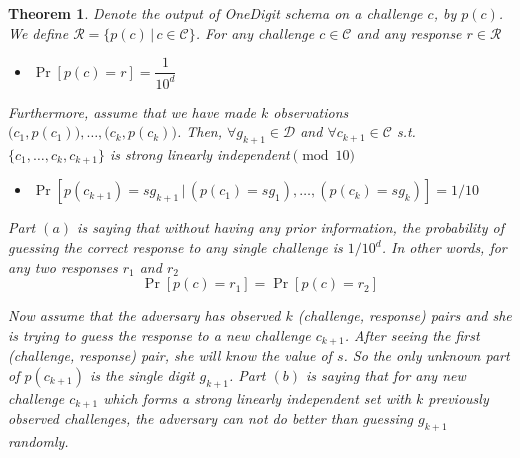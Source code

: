 \documentclass{article}
\newtheorem{theorem}{Theorem}
\begin{document}
\begin{theorem}
\label{thm:main}
	Denote the output of OneDigit schema on a challenge $c$, by $p(c)$. We define $\mathcal{R}=\{p(c) \, | \, c\in\mathcal{C}\}$. For any challenge $c\in \mathcal{C}$ and any response $r\in \mathcal{R}$
	\begin{itemize} 
		\item[$(a)$]$\Pr[p(c)=r]=\dfrac{1}{10^d}$
	\end{itemize}
Furthermore, assume that we have made $k$ observations $\big(c_1,p(c_1)\big),\ldots, \big(c_k, p(c_k)\big)$. Then, $\forall g_{k+1}\in\mathcal{D}$ and $\forall c_{k+1}\in \mathcal{C}$ s.t. $\{c_1,\ldots,c_k,c_{k+1}\}$ is strong linearly independent$\pmod{10}$ 
	\begin{itemize}
		\item[$(b)$] $\Pr[p(c_{k+1})=s g_{k+1} \, | \, (p(c_1)=s g_1),\ldots, (p(c_k)=s g_k)]=1/10$
	\end{itemize}
Part $(a)$ is saying that without having any prior information, the probability of guessing the correct response to any single challenge is ${1}/{10^d}$. In other words, for any two responses $r_1$ and $r_2$
$$\Pr[p(c)=r_1]=\Pr[p(c)=r_2]$$

\noindent Now assume that the adversary has observed $k$ (challenge, response) pairs and she is trying to guess the response to a new challenge $c_{k+1}$. After seeing the first (challenge, response) pair, she will know the value of $s$. So the only unknown part of $p(c_{k+1})$ is the single digit $g_{k+1}$. Part $(b)$ is saying that for any new challenge $c_{k+1}$ which forms a strong linearly independent set with $k$ previously observed challenges, the adversary can not do better than guessing $g_{k+1}$ randomly.

\end{theorem}
\end{document}
